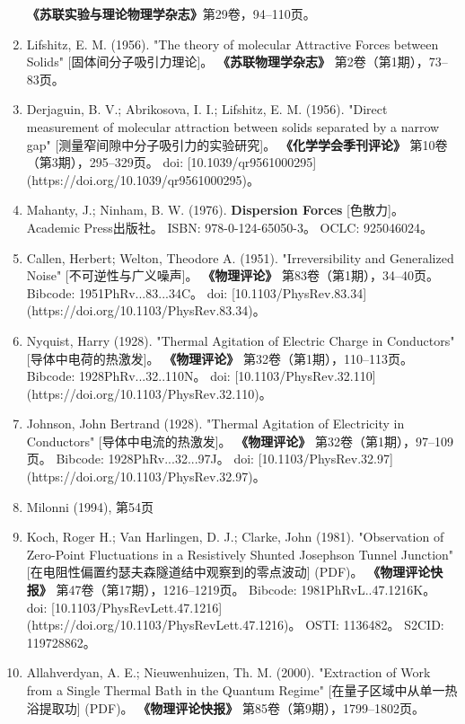 \begin{enumerate}
  \textbf{《苏联实验与理论物理学杂志》}第29卷，94–110页。  
\item Lifshitz, E. M. (1956).  
  "The theory of molecular Attractive Forces between Solids" [固体间分子吸引力理论]。  
  \textbf{《苏联物理学杂志》} 第2卷（第1期），73–83页。  
\item Derjaguin, B. V.; Abrikosova, I. I.; Lifshitz, E. M. (1956). 
  "Direct measurement of molecular attraction between solids separated by a narrow gap" [测量窄间隙中分子吸引力的实验研究]。  
  \textbf{《化学学会季刊评论》} 第10卷（第3期），295–329页。  
  doi: [10.1039/qr9561000295](https://doi.org/10.1039/qr9561000295)。  
\item Mahanty, J.; Ninham, B. W. (1976).  
  \textbf{Dispersion Forces} [色散力]。  
  Academic Press出版社。  
  ISBN: 978-0-124-65050-3。  
  OCLC: 925046024。  
\item Callen, Herbert; Welton, Theodore A. (1951). 
  "Irreversibility and Generalized Noise" [不可逆性与广义噪声]。  
  \textbf{《物理评论》} 第83卷（第1期），34–40页。  
  Bibcode: 1951PhRv...83...34C。  
  doi: [10.1103/PhysRev.83.34](https://doi.org/10.1103/PhysRev.83.34)。  
\item Nyquist, Harry (1928).  
  "Thermal Agitation of Electric Charge in Conductors" [导体中电荷的热激发]。  
  \textbf{《物理评论》} 第32卷（第1期），110–113页。  
  Bibcode: 1928PhRv...32..110N。  
  doi: [10.1103/PhysRev.32.110](https://doi.org/10.1103/PhysRev.32.110)。  
\item Johnson, John Bertrand (1928).  
  "Thermal Agitation of Electricity in Conductors" [导体中电流的热激发]。  
  \textbf{《物理评论》} 第32卷（第1期），97–109页。  
  Bibcode: 1928PhRv...32...97J。  
  doi: [10.1103/PhysRev.32.97](https://doi.org/10.1103/PhysRev.32.97)。  
\item Milonni (1994), 第54页 
\item Koch, Roger H.; Van Harlingen, D. J.; Clarke, John (1981). 
  "Observation of Zero-Point Fluctuations in a Resistively Shunted Josephson Tunnel Junction" [在电阻性偏置约瑟夫森隧道结中观察到的零点波动] (PDF)。  
  \textbf{《物理评论快报》} 第47卷（第17期），1216–1219页。  
  Bibcode: 1981PhRvL..47.1216K。  
  doi: [10.1103/PhysRevLett.47.1216](https://doi.org/10.1103/PhysRevLett.47.1216)。  
  OSTI: 1136482。  
  S2CID: 119728862。  
\item Allahverdyan, A. E.; Nieuwenhuizen, Th. M. (2000).  
  "Extraction of Work from a Single Thermal Bath in the Quantum Regime" [在量子区域中从单一热浴提取功] (PDF)。  
  \textbf{《物理评论快报》} 第85卷（第9期），1799–1802页。  

\end{enumerate}
